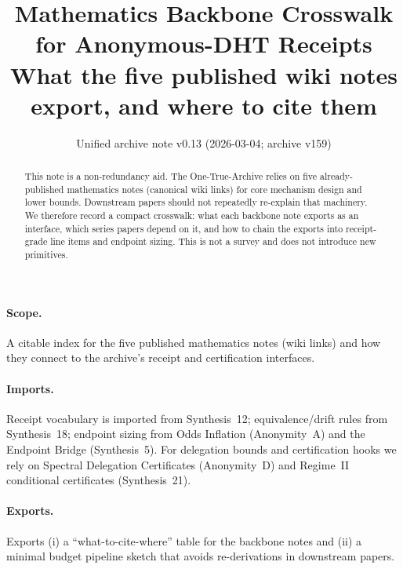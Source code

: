 \documentclass[11pt]{article}
\title{Mathematics Backbone Crosswalk for Anonymous-DHT Receipts\\
\large What the five published wiki notes export, and where to cite them}
\author{}
\date{Unified archive note v0.13 (2026-03-04; archive v159)}
\begin{document}
\maketitle

\begin{abstract}
This note is a non-redundancy aid.
The One-True-Archive relies on five already-published mathematics notes (canonical wiki links) for core mechanism design and lower bounds.
Downstream papers should not repeatedly re-explain that machinery.
We therefore record a compact crosswalk: what each backbone note exports as an interface, which series papers depend on it, and how to chain the exports into receipt-grade line items and endpoint sizing.
This is not a survey and does not introduce new primitives.
\end{abstract}

\paragraph{Scope.}
A citable index for the five published mathematics notes (wiki links) and how they connect to the archive's receipt and certification interfaces.

\paragraph{Imports.}
Receipt vocabulary is imported from Synthesis~12; equivalence/drift rules from Synthesis~18; endpoint sizing from Odds Inflation (Anonymity~A) and the Endpoint Bridge (Synthesis~5).
For delegation bounds and certification hooks we rely on Spectral Delegation Certificates (Anonymity~D) and Regime~II conditional certificates (Synthesis~21).\cite{series:receiptitems,series:planstateequiv,series:oddsinflation,series:endpointbridge,series:spectral2budget,series:condcert}

\paragraph{Exports.}
Exports (i) a ``what-to-cite-where'' table for the backbone notes and (ii) a minimal budget pipeline sketch that avoids re-derivations in downstream papers.
\end{document}
